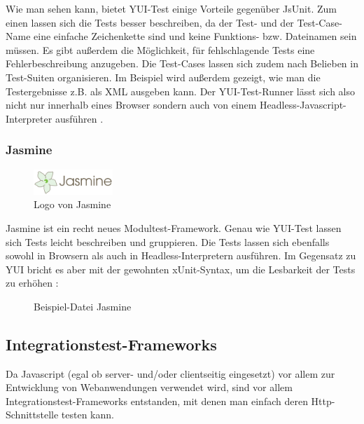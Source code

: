 Wie man sehen kann, bietet YUI-Test einige Vorteile gegenüber JsUnit. Zum einen lassen sich die Tests besser beschreiben, da der Test- und der Test-Case-Name eine einfache Zeichenkette sind und keine Funktions- bzw. Dateinamen sein müssen. Es gibt außerdem die Möglichkeit, für fehlschlagende Tests eine Fehlerbeschreibung anzugeben. Die Test-Cases lassen sich zudem nach Belieben in Test-Suiten organisieren. Im Beispiel wird außerdem gezeigt, wie man die Testergebnisse z.B. als XML ausgeben kann. Der YUI-Test-Runner lässt sich also nicht nur innerhalb eines Browser sondern auch von einem Headless-Javascript-Interpreter ausführen \citep[Vgl.][]{Yahoo13}.

\subsubsection{Jasmine}

\begin{figure}[H]
	\begin{center}
		\includegraphics[width=3cm]{bilder/jasmine}
		\caption{Logo von Jasmine}
		\label{image:jasmine}
	\end{center}
\end{figure}

Jasmine ist ein recht neues Modultest-Framework. Genau wie YUI-Test lassen sich Tests leicht beschreiben und gruppieren. Die Tests lassen sich ebenfalls sowohl in Browsern als auch in Headless-Interpretern ausführen. Im Gegensatz zu YUI bricht es aber mit der gewohnten xUnit-Syntax, um die Lesbarkeit der Tests zu erhöhen \citep[Vgl.][]{Pivotal13}:

\begin{figure}[H]
	\begin{center}
		\caption{Beispiel-Datei Jasmine}
		\label{code:jasmine}
	\end{center}
\end{figure}

\subsection{Integrationstest-Frameworks}

Da Javascript (egal ob server- und/oder clientseitig eingesetzt) vor allem zur Entwicklung von Webanwendungen verwendet wird, sind vor allem Integrationstest-Frameworks entstanden, mit denen man einfach deren Http-Schnittstelle testen kann.


